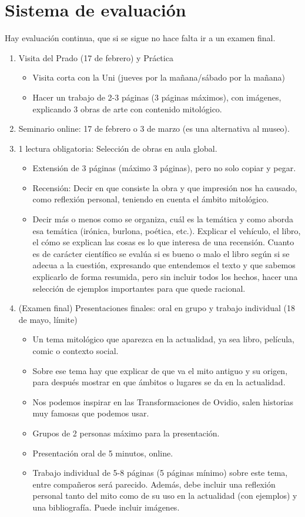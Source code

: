 \section{Sistema de evaluación}\label{sec:sistema-de-evaluación}
Hay evaluación continua, que si se sigue no hace falta ir a un examen final.
\begin{enumerate}
    \item Visita del Prado (17 de febrero) y Práctica
    \begin{itemize}
      \item Visita corta con la Uni (jueves por la mañana/sábado por la mañana)
      \item Hacer un trabajo de 2-3 páginas (3 páginas máximos), con imágenes, explicando 3 obras de arte con contenido mitológico.
    \end{itemize}
  \item Seminario online: 17 de febrero o 3 de marzo (es una alternativa al museo).
  \item 1 lectura obligatoria: Selección de obras en aula global.
    \begin{itemize}
      \item Extensión de 3 páginas (máximo 3 páginas), pero no solo copiar y pegar.
      \item Recensión: Decir en que consiste la obra y que impresión nos ha causado, como reflexión personal, teniendo en cuenta el ámbito mitológico.
      \item Decir más o menos como se organiza, cuál es la temática y como aborda esa temática (irónica, burlona, poética, etc.). Explicar el vehículo, el libro, el cómo se explican las cosas es lo que interesa de una recensión. Cuanto es de carácter científico se evalúa si es bueno o malo el libro según si se adecua a la cuestión, expresando que entendemos el texto y que sabemos explicarlo de forma resumida, pero sin incluir todos los hechos, hacer una selección de ejemplos importantes para que quede racional.
    \end{itemize}
  \item (Examen final) Presentaciones finales: oral en grupo y trabajo individual (18 de mayo, límite)
    \begin{itemize}
      \item Un tema mitológico que aparezca en la actualidad, ya sea libro, película, comic o contexto social.
      \item Sobre ese tema hay que explicar de que va el mito antiguo y su origen, para después mostrar en que ámbitos o lugares se da en la actualidad.
      \item Nos podemos inspirar en las Transformaciones de Ovidio, salen historias muy famosas que podemos usar.
      \item Grupos de 2 personas máximo para la presentación.
      \item Presentación oral de 5 minutos, online.
      \item Trabajo individual de 5-8 páginas (5 páginas mínimo) sobre este tema, entre compañeros será parecido. Además, debe incluir una reflexión personal tanto del mito como de su uso en la actualidad (con ejemplos) y una bibliografía. Puede incluir imágenes.
    \end{itemize}
\end{enumerate}